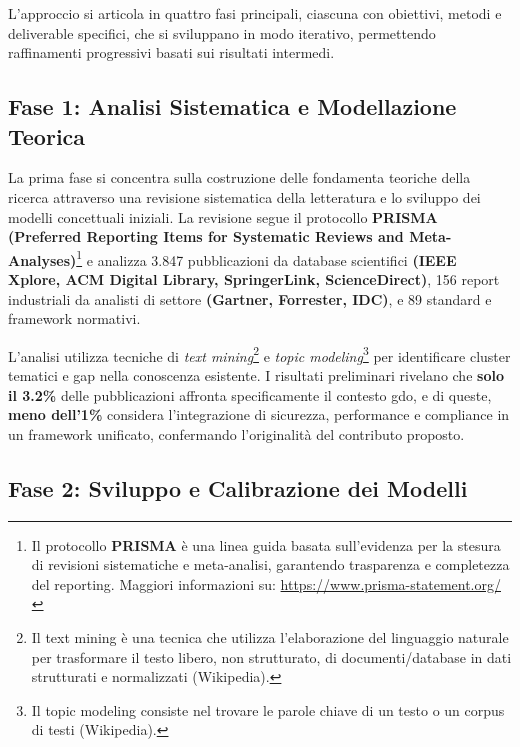 L'approccio si articola in quattro fasi principali, ciascuna con obiettivi, metodi e deliverable specifici, che si sviluppano in modo iterativo, permettendo raffinamenti progressivi basati sui risultati intermedi.

\subsection{\texorpdfstring{\textbf{Fase 1: Analisi Sistematica e Modellazione Teorica}}{1.5.2 - Fase 1: Analisi Sistematica e Modellazione Teorica}}

\label{ssec:fase1}
La prima fase si concentra sulla costruzione delle fondamenta teoriche della ricerca attraverso una revisione sistematica della letteratura e lo sviluppo dei modelli concettuali iniziali. La revisione segue il protocollo \textbf{PRISMA (Preferred Reporting Items for Systematic Reviews and Meta-Analyses)}\footnote{Il protocollo \textbf{PRISMA} è una linea guida basata sull'evidenza per la stesura di revisioni sistematiche e meta-analisi, garantendo trasparenza e completezza del reporting. Maggiori informazioni su: \url{https://www.prisma-statement.org/}} e analizza 3.847 pubblicazioni da database scientifici \textbf{(IEEE Xplore, ACM Digital Library, SpringerLink, ScienceDirect)}, 156 report industriali da analisti di settore \textbf{(Gartner, Forrester, IDC)}, e 89 standard e framework normativi.

L'analisi utilizza tecniche di \textit{text mining}\footnote{Il text mining è una tecnica che utilizza l'elaborazione del linguaggio naturale per trasformare il testo libero, non strutturato, di documenti/database in dati strutturati e normalizzati (Wikipedia).} e\textit{ topic modeling}\footnote{Il topic modeling consiste nel trovare le parole chiave di un testo o un corpus di testi (Wikipedia).} per identificare cluster tematici e gap nella conoscenza esistente. I risultati preliminari rivelano che \textbf{solo il 3.2\%} delle pubblicazioni affronta specificamente il contesto \gls{gdo}, e di queste, \textbf{meno dell'1\%} considera l'integrazione di sicurezza, performance e compliance in un framework unificato, confermando l'originalità del contributo proposto.

\subsection{\texorpdfstring{\textbf{Fase 2: Sviluppo e Calibrazione dei Modelli}}{1.5.3 - Fase 2: Sviluppo e Calibrazione dei Modelli}}

